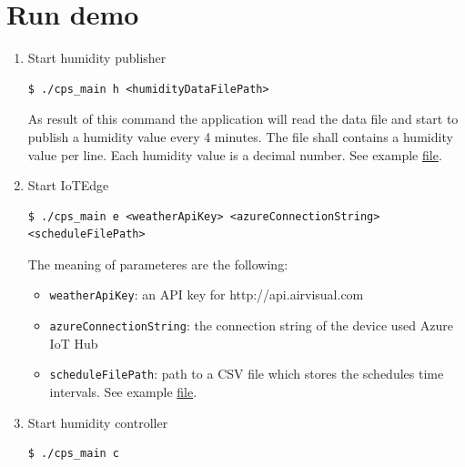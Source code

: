 \documentclass{article}
\begin{document}
\section{Run demo}
\begin{enumerate}
\item Start humidity publisher
\begin{verbatim}
$ ./cps_main h <humidityDataFilePath>
\end{verbatim}

As result of this command the application will read the data file and start to publish a humidity value every 4 minutes. The file shall contains a humidity value per line. Each humidity value is a decimal number. See example \href{https://github.com/antaljanosbenjamin/cps_homework/blob/master/examples/humidity.txt}{file}.
\item Start IoTEdge 
\begin{lstlisting}
$ ./cps_main e <weatherApiKey> <azureConnectionString> <scheduleFilePath>
\end{lstlisting} 
The meaning of parameteres are the following:
\begin{itemize}
\item \verb+weatherApiKey+: an API key for http://api.airvisual.com
\item \verb+azureConnectionString+: the connection string of the device used Azure IoT Hub
\item \verb+scheduleFilePath+: path to a CSV file which stores the schedules time intervals. See example \href{https://github.com/antaljanosbenjamin/cps_homework/blob/master/examples/schedule.csv}{file}.
\end{itemize}
\item Start humidity controller
\begin{verbatim}
$ ./cps_main c
\end{verbatim}
\end{enumerate}
\end{document}
